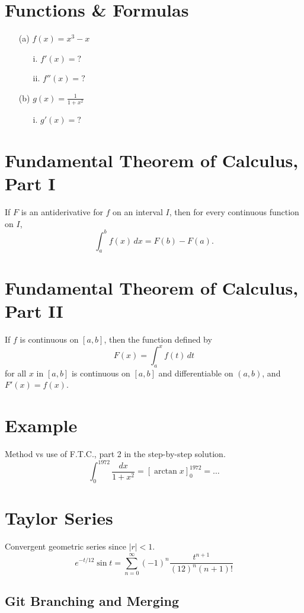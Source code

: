 \documentclass[12pt]{article}
\begin{document}
\section*{Functions \& Formulas}
\begin{enumerate}
    \item[(a)] \(f(x) = x^3 - x\)
    \begin{enumerate}
        \item[i.] \(f'(x) = ?\)
        \item[ii.] \(f''(x) = ?\)
    \end{enumerate}
    \item[(b)] \(g(x) = \frac{1}{1+x^2}\)
    \begin{enumerate}
        \item[i.] \(g'(x) = ?\)
    \end{enumerate}
\end{enumerate}

\section*{Fundamental Theorem of Calculus, Part I}
If \(F\) is an antiderivative for \(f\) on an interval \(I\), then for every continuous function on \(I\),
\[ \int_a^b f(x)\, dx = F(b) - F(a). \]

\section*{Fundamental Theorem of Calculus, Part II}
If \(f\) is continuous on \([a,b]\), then the function defined by
\[ F(x) = \int_a^x f(t)\, dt \]
for all \(x\) in \([a,b]\) is continuous on \([a,b]\) and differentiable on \((a,b)\), and \(F'(x) = f(x)\).

\section*{Example}
Method vs use of F.T.C., part 2 in the step-by-step solution.
\[ \int_0^{1972} \frac{dx}{1+x^2} = [\arctan x]_0^{1972} = \ldots \]

\section*{Taylor Series}
Convergent geometric series since \(|r| < 1\).
\[ e^{-t/12} \sin t = \sum_{n=0}^\infty (-1)^n \frac{t^{n+1}}{(12)^n (n+1)!} \]
\newpage
\subsection*{Git Branching and Merging}
\end{document}
